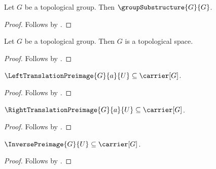 \begin{corollary}\label{topological_group_is_own_group_substructure}
    Let $G$ be a topological group.
    Then $\groupSubstructure{G}{G}$.
\end{corollary}
\begin{proof}
    Follows by
        .
\end{proof}

\begin{corollary}\label{topological_group_is_topological_space}
    Let $G$ be a topological group.
    Then $G$ is a topological space.
\end{corollary}
\begin{proof}
    Follows by .
\end{proof}

\begin{proposition}\label{left_translation_preimage_type}
    $\LeftTranslationPreimage{G}{a}{U}\subseteq\carrier[G]$.
\end{proposition}
\begin{proof}
    Follows by .
\end{proof}

\begin{proposition}\label{right_translation_preimage_type}
    $\RightTranslationPreimage{G}{a}{U}\subseteq\carrier[G]$.
\end{proposition}
\begin{proof}
    Follows by .
\end{proof}

\begin{proposition}\label{inverse_preimage_type}
    $\InversePreimage{G}{U}\subseteq\carrier[G]$.
\end{proposition}
\begin{proof}
    Follows by .
\end{proof}


